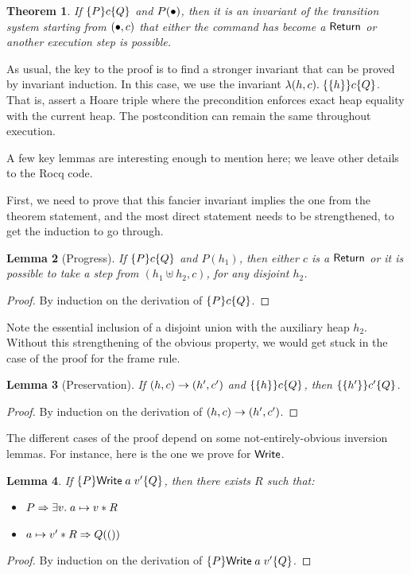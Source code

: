 \documentclass{amsbook}
\newtheorem{theorem}{Theorem}[chapter]
\newtheorem{lemma}[theorem]{Lemma}
\theoremstyle{definition}
\theoremstyle{remark}
\numberwithin{section}{chapter}
\numberwithin{equation}{chapter}
\begin{document}
\invariants
\begin{theorem}
  If $\{P\} c \{Q\}$ and $P(\bullet)$, then it is an invariant of the transition system starting from $(\bullet, c)$ that either the command has become a $\mathsf{Return}$ or another execution step is possible.
\end{theorem}

As usual, the key to the proof is to find a stronger invariant that can be proved by invariant induction.
In this case, we use the invariant $\lambda (h, c). \; \{\{h\}\} c \{Q\}$.
That is, assert a Hoare triple where the precondition enforces exact heap equality with the current heap.
The postcondition can remain the same throughout execution.

A few key lemmas are interesting enough to mention here; we leave other details to the Rocq code.

First, we need to prove that this fancier invariant implies the one from the theorem statement, and the most direct statement needs to be strengthened, to get the induction to go through.

\begin{lemma}[Progress]
  If $\{P\} c \{Q\}$ and $P(h_1)$, then either $c$ is a $\mathsf{Return}$ or it is possible to take a step from $(h_1 \uplus h_2, c)$, for any disjoint $h_2$.
\end{lemma}
\begin{proof}
  By induction on the derivation of $\{P\} c \{Q\}$.
\end{proof}

Note the essential inclusion of a disjoint union with the auxiliary heap $h_2$.
Without this strengthening of the obvious property, we would get stuck in the case of the proof for the frame rule.

\begin{lemma}[Preservation]
  If $(h, c) \to (h', c')$ and $\{\{h\}\} c \{Q\}$, then $\{\{h'\}\} c' \{Q\}$.
\end{lemma}
\begin{proof}
  By induction on the derivation of $(h, c) \to (h', c')$.
\end{proof}

The different cases of the proof depend on some not-entirely-obvious inversion lemmas.
For instance, here is the one we prove for $\mathsf{Write}$.

\begin{lemma}
  If $\{P\} \mathsf{Write} \; a \; v' \{Q\}$, then there exists $R$ such that:
  \begin{itemize}
  \item $P \Rightarrow \exists v. \; a \mapsto v * R$
  \item $a \mapsto v' * R \Rightarrow Q(())$
  \end{itemize}
\end{lemma}
\begin{proof}
  By induction on the derivation of $\{P\} \mathsf{Write} \; a \; v' \{Q\}$.
\end{proof}
\end{document}
